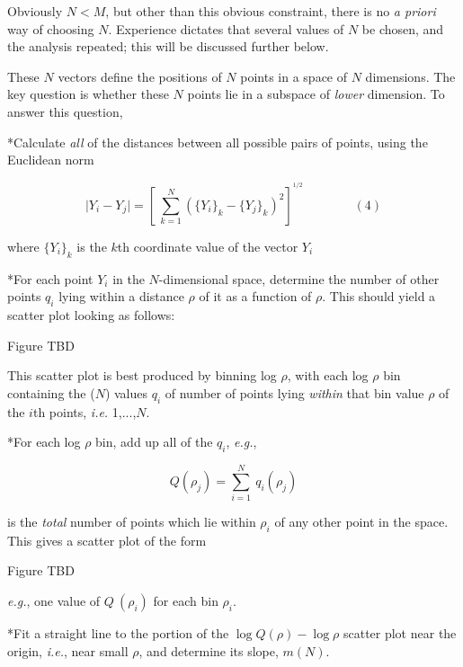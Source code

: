 Obviously $N < M$, but other than this obvious constraint, there is no
{\it a priori} way of choosing $N$. Experience dictates that
several values of $N$ be chosen, and the analysis repeated; this will
be discussed further below.

These $N$ vectors define the positions of $N$ points in a space of $N$
dimensions.  The key question is whether these $N$ points lie in a
subspace of {\it lower} dimension. To answer this question,

\**Calculate {\it all} of the distances between all possible
pairs of points, using the Euclidean norm

$$\mid Y_{i}-Y_{j}\mid = \left[\ \sum_{k=1}^{N} \left(\{Y_{i}\}_{k} -
\{Y_{j}\}_{k}\right)^{2}\right]^{^{1/2}}\qquad\qquad(4)$$

{\list

where $\{Y_{i}\}_{k}$ is the $k$th coordinate value of the vector
$Y_{i}$

}

\**For each point $Y_{i}$ in the $N$-dimensional space, determine the
number of other points $q_{i}$ lying within a distance $\rho$ of it as
a function of $\rho$. This should yield a scatter plot looking as
follows:

\vskip 1.5in
\centerline{Figure TBD}
\vskip 1.5in

{\list

This scatter plot is best produced by binning log $\rho$, with each
log $\rho$ bin containing the ($N$) values $q_{i}$ of number of points
lying {\it within} that bin value $\rho$ of the $i$th points,
{\it i.e.} 1,...,$N$.

}

\**For each log $\rho$ bin, add up all of the $q_{i}$, {\it e.g.},

$$Q(\rho_{j}) = \sum_{i=1}^{N}\ q_{i}(\rho_{j})$$

{\list

is the {\it total} number of points which lie within $\rho_i$
of any other point in the space.  This gives a scatter plot of the
form

}

\vskip 1.5in
\centerline{Figure TBD}
\vskip 1.5in

{\list 

{\it e.g.}, one value of $Q\ (\rho_{i})$ for each bin
$\rho_{i}$.

}

\**Fit a straight line to the portion of the $\log Q(\rho) - \log
\rho$ scatter plot near the origin, {\it i.e.}, near small $\rho$, and
determine its slope, $m(N)$.

